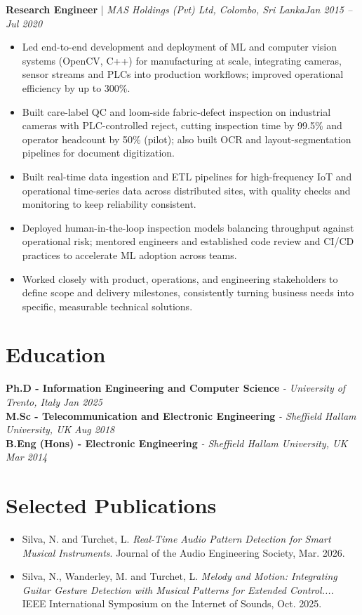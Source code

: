 \documentclass[11pt]{article}
\newenvironment{cvrole}[5]{%
  \par\noindent\textbf{\large #1} | \textit{\small #2, #3}\hfill \textit{\small #4 -- #5}\par
  \begin{itemize}[leftmargin=2em, itemsep=-0.3em, topsep=-0.5em]%
}{%
  \end{itemize}\par\noindent\mbox{}\par\vspace{0.1em}%
}
\begin{document}
\begin{cvrole}{Research Engineer}{MAS Holdings (Pvt) Ltd}{Colombo, Sri Lanka}{Jan 2015}{Jul 2020}
    \item Led end-to-end development and deployment of ML and computer vision systems (OpenCV, C++) for manufacturing at scale, integrating cameras, sensor streams and PLCs into production workflows; improved operational efficiency by up to 300\%.
    \item Built care-label QC and loom-side fabric-defect inspection on industrial cameras with PLC-controlled reject, cutting inspection time by 99.5\% and operator headcount by 50\% (pilot); also built OCR and layout-segmentation pipelines for document digitization.
    \item Built real-time data ingestion and ETL pipelines for high-frequency IoT and operational time-series data across distributed sites, with quality checks and monitoring to keep reliability consistent.
    \item Deployed human-in-the-loop inspection models balancing throughput against operational risk; mentored engineers and established code review and CI/CD practices to accelerate ML adoption across teams.
    \item Worked closely with product, operations, and engineering stakeholders to define scope and delivery milestones, consistently turning business needs into specific, measurable technical solutions.
\end{cvrole}

\section*{Education}
\noindent\textbf{Ph.D - Information Engineering and Computer Science} \textit{\small{ - University of Trento, Italy}} \hfill \textit{Jan 2025}\\[2pt]
\noindent\textbf{M.Sc - Telecommunication and Electronic Engineering} \textit{\small{ - Sheffield Hallam University, UK}} \hfill \textit{Aug 2018}\\[2pt]
\noindent\textbf{B.Eng (Hons) - Electronic Engineering} \textit{\small{ - Sheffield Hallam University, UK}} \hfill \textit{Mar 2014}

\section*{Selected Publications \footnotesize {}}
\begin{itemize}[leftmargin=1.2em, itemsep=-0.25em]
    \item Silva, N. and Turchet, L. \textit{Real-Time Audio Pattern Detection for Smart Musical Instruments}. Journal of the Audio Engineering Society, Mar. 2026.
    \item Silva, N., Wanderley, M. and Turchet, L. \textit{Melody and Motion: Integrating Guitar Gesture Detection with Musical Patterns for Extended Control....} IEEE International Symposium on the Internet of Sounds, Oct. 2025.
\end{itemize}
\end{document}
